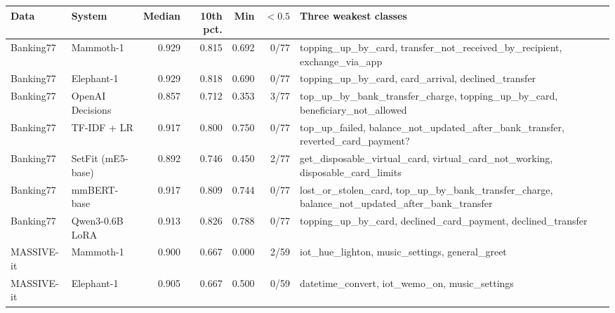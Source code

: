 \begin{tabular}{llrrrr>{\raggedright\arraybackslash}p{4.9cm}}
\toprule
Data & System & Median & 10th pct. & Min & $<0.5$ & Three weakest classes \\
\midrule
Banking77 & Mammoth-1 & 0.929 & 0.815 & 0.692 & 0/77 & topping\_\allowbreak{}up\_\allowbreak{}by\_\allowbreak{}card, transfer\_\allowbreak{}not\_\allowbreak{}received\_\allowbreak{}by\_\allowbreak{}recipient, exchange\_\allowbreak{}via\_\allowbreak{}app \\
Banking77 & Elephant-1 & 0.929 & 0.818 & 0.690 & 0/77 & topping\_\allowbreak{}up\_\allowbreak{}by\_\allowbreak{}card, card\_\allowbreak{}arrival, declined\_\allowbreak{}transfer \\
Banking77 & OpenAI Decisions & 0.857 & 0.712 & 0.353 & 3/77 & top\_\allowbreak{}up\_\allowbreak{}by\_\allowbreak{}bank\_\allowbreak{}transfer\_\allowbreak{}charge, topping\_\allowbreak{}up\_\allowbreak{}by\_\allowbreak{}card, beneficiary\_\allowbreak{}not\_\allowbreak{}allowed \\
Banking77 & TF-IDF + LR & 0.917 & 0.800 & 0.750 & 0/77 & top\_\allowbreak{}up\_\allowbreak{}failed, balance\_\allowbreak{}not\_\allowbreak{}updated\_\allowbreak{}after\_\allowbreak{}bank\_\allowbreak{}transfer, reverted\_\allowbreak{}card\_\allowbreak{}payment? \\
Banking77 & SetFit (mE5-base) & 0.892 & 0.746 & 0.450 & 2/77 & get\_\allowbreak{}disposable\_\allowbreak{}virtual\_\allowbreak{}card, virtual\_\allowbreak{}card\_\allowbreak{}not\_\allowbreak{}working, disposable\_\allowbreak{}card\_\allowbreak{}limits \\
Banking77 & mmBERT-base & 0.917 & 0.809 & 0.744 & 0/77 & lost\_\allowbreak{}or\_\allowbreak{}stolen\_\allowbreak{}card, top\_\allowbreak{}up\_\allowbreak{}by\_\allowbreak{}bank\_\allowbreak{}transfer\_\allowbreak{}charge, balance\_\allowbreak{}not\_\allowbreak{}updated\_\allowbreak{}after\_\allowbreak{}bank\_\allowbreak{}transfer \\
Banking77 & Qwen3-0.6B LoRA & 0.913 & 0.826 & 0.788 & 0/77 & topping\_\allowbreak{}up\_\allowbreak{}by\_\allowbreak{}card, declined\_\allowbreak{}card\_\allowbreak{}payment, declined\_\allowbreak{}transfer \\
\midrule
MASSIVE-it & Mammoth-1 & 0.900 & 0.667 & 0.000 & 2/59 & iot\_\allowbreak{}hue\_\allowbreak{}lighton, music\_\allowbreak{}settings, general\_\allowbreak{}greet \\
MASSIVE-it & Elephant-1 & 0.905 & 0.667 & 0.500 & 0/59 & datetime\_\allowbreak{}convert, iot\_\allowbreak{}wemo\_\allowbreak{}on, music\_\allowbreak{}settings \\

\end{tabular}
